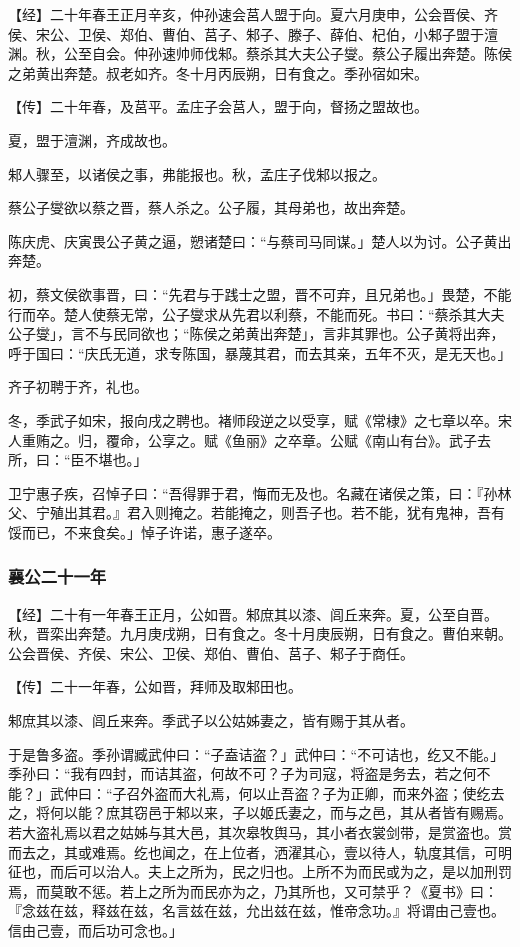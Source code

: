 \documentclass[]{article}
\begin{document}
【经】二十年春王正月辛亥，仲孙速会莒人盟于向。夏六月庚申，公会晋侯、齐侯、宋公、卫侯、郑伯、曹伯、莒子、邾子、滕子、薛伯、杞伯，小邾子盟于澶渊。秋，公至自会。仲孙速帅师伐邾。蔡杀其大夫公子燮。蔡公子履出奔楚。陈侯之弟黄出奔楚。叔老如齐。冬十月丙辰朔，日有食之。季孙宿如宋。

【传】二十年春，及莒平。孟庄子会莒人，盟于向，督扬之盟故也。

夏，盟于澶渊，齐成故也。

邾人骤至，以诸侯之事，弗能报也。秋，孟庄子伐邾以报之。

蔡公子燮欲以蔡之晋，蔡人杀之。公子履，其母弟也，故出奔楚。

陈庆虎、庆寅畏公子黄之逼，愬诸楚曰：``与蔡司马同谋。」楚人以为讨。公子黄出奔楚。

初，蔡文侯欲事晋，曰：``先君与于践士之盟，晋不可弃，且兄弟也。」畏楚，不能行而卒。楚人使蔡无常，公子燮求从先君以利蔡，不能而死。书曰：``蔡杀其大夫公子燮」，言不与民同欲也；``陈侯之弟黄出奔楚」，言非其罪也。公子黄将出奔，呼于国曰：``庆氏无道，求专陈国，暴蔑其君，而去其亲，五年不灭，是无天也。」

齐子初聘于齐，礼也。

冬，季武子如宋，报向戌之聘也。褚师段逆之以受享，赋《常棣》之七章以卒。宋人重贿之。归，覆命，公享之。赋《鱼丽》之卒章。公赋《南山有台》。武子去所，曰：``臣不堪也。」

卫宁惠子疾，召悼子曰：``吾得罪于君，悔而无及也。名藏在诸侯之策，曰：『孙林父、宁殖出其君。』君入则掩之。若能掩之，则吾子也。若不能，犹有鬼神，吾有馁而已，不来食矣。」悼子许诺，惠子遂卒。

\hypertarget{header-n2103}{%
\subsubsection{襄公二十一年}\label{header-n2103}}

【经】二十有一年春王正月，公如晋。邾庶其以漆、闾丘来奔。夏，公至自晋。秋，晋栾出奔楚。九月庚戌朔，日有食之。冬十月庚辰朔，日有食之。曹伯来朝。公会晋侯、齐侯、宋公、卫侯、郑伯、曹伯、莒子、邾子于商任。

【传】二十一年春，公如晋，拜师及取邾田也。

邾庶其以漆、闾丘来奔。季武子以公姑姊妻之，皆有赐于其从者。

于是鲁多盗。季孙谓臧武仲曰：``子盍诘盗？」武仲曰：``不可诘也，纥又不能。」季孙曰：``我有四封，而诘其盗，何故不可？子为司寇，将盗是务去，若之何不能？」武仲曰：``子召外盗而大礼焉，何以止吾盗？子为正卿，而来外盗；使纥去之，将何以能？庶其窃邑于邾以来，子以姬氏妻之，而与之邑，其从者皆有赐焉。若大盗礼焉以君之姑姊与其大邑，其次皋牧舆马，其小者衣裳剑带，是赏盗也。赏而去之，其或难焉。纥也闻之，在上位者，洒濯其心，壹以待人，轨度其信，可明征也，而后可以治人。夫上之所为，民之归也。上所不为而民或为之，是以加刑罚焉，而莫敢不惩。若上之所为而民亦为之，乃其所也，又可禁乎？《夏书》曰：『念兹在兹，释兹在兹，名言兹在兹，允出兹在兹，惟帝念功。』将谓由己壹也。信由己壹，而后功可念也。」
\end{document}
